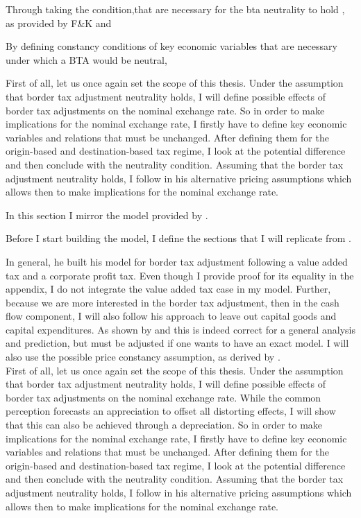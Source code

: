 Through taking the condition,that are necessary for the bta neutrality to hold , as provided by F&K and 

By defining constancy conditions of key economic variables that are necessary under which a BTA would be neutral, 


First of all, let us once again set the scope of this thesis. Under the assumption that border tax adjustment neutrality holds, I will define possible effects of border tax adjustments on the nominal exchange rate. So in order to make implications for the nominal exchange rate, I firstly have to define key economic variables and relations that must be unchanged. After defining them for the origin-based and destination-based tax regime, I look at the potential difference and then conclude with the neutrality condition. Assuming that the border tax adjustment neutrality holds, I follow \cite{buiter2017exchange} in his alternative pricing assumptions which allows then to make implications for the nominal exchange rate.


In this section I mirror the model provided by \cite{buiter2017exchange}. 

Before I start building the model, I define the sections that I will replicate from \cite{buiter2017exchange}. 


In general, he built his model for border tax adjustment following a value added tax and a corporate profit tax. Even though I provide proof for its equality in the appendix, I do not integrate the value added tax case in my model. 
Further, because we are more interested in the border tax adjustment, then in the cash flow component, I will also follow his approach to leave out capital goods and capital expenditures. As shown by \cite{barbiero2018macroeconomics} and \cite{gopinath2017macroeconomic} this is indeed correct for a general analysis and prediction, but must be adjusted if one wants to have an exact model. I will also use the possible price constancy assumption, as derived by \cite{buiter2017exchange}.  \\


First of all, let us once again set the scope of this thesis. Under the assumption that border tax adjustment neutrality holds, I will define possible effects of border tax adjustments on the nominal exchange rate. While the common perception forecasts an appreciation to offset all distorting effects, I will show that this can also be achieved through a depreciation. So in order to make implications for the nominal exchange rate, I firstly have to define key economic variables and relations that must be unchanged. After defining them for the origin-based and destination-based tax regime, I look at the potential difference and then conclude with the neutrality condition. Assuming that the border tax adjustment neutrality holds, 
I follow \cite{buiter2017exchange} in his alternative pricing assumptions which allows then to make implications for the nominal exchange rate.  